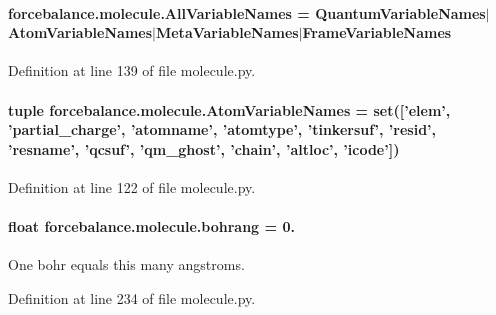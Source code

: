\hypertarget{namespaceforcebalance_1_1molecule_a8fcfb88fe12a9256b61980f3d4fe3b63}{
\paragraph[{All\-Variable\-Names}]{\setlength{\rightskip}{0pt plus 5cm}forcebalance.\-molecule.\-All\-Variable\-Names = {\bf Quantum\-Variable\-Names}$|${\bf Atom\-Variable\-Names}$|${\bf Meta\-Variable\-Names}$|${\bf Frame\-Variable\-Names}}}\label{namespaceforcebalance_1_1molecule_a8fcfb88fe12a9256b61980f3d4fe3b63}


Definition at line 139 of file molecule.\-py.

\hypertarget{namespaceforcebalance_1_1molecule_a5daa68e835dcb9877d6c3f2fb559b54b}{
\paragraph[{Atom\-Variable\-Names}]{\setlength{\rightskip}{0pt plus 5cm}tuple forcebalance.\-molecule.\-Atom\-Variable\-Names = set(\mbox{[}'elem', 'partial\-\_\-charge', 'atomname', 'atomtype', 'tinkersuf', 'resid', 'resname', 'qcsuf', 'qm\-\_\-ghost', 'chain', 'altloc', 'icode'\mbox{]})}}\label{namespaceforcebalance_1_1molecule_a5daa68e835dcb9877d6c3f2fb559b54b}


Definition at line 122 of file molecule.\-py.

\hypertarget{namespaceforcebalance_1_1molecule_a76af9edfbaaa8999680e32aafe1b1b61}{
\paragraph[{bohrang}]{\setlength{\rightskip}{0pt plus 5cm}float forcebalance.\-molecule.\-bohrang = 0.}}\label{namespaceforcebalance_1_1molecule_a76af9edfbaaa8999680e32aafe1b1b61}


One bohr equals this many angstroms. 



Definition at line 234 of file molecule.\-py.

